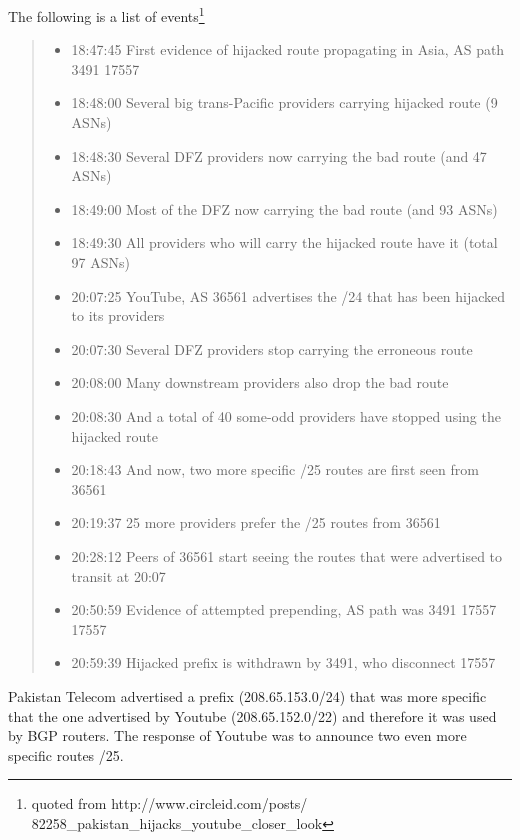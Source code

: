 The following is a list of events\footnote{quoted from http://www.circleid.com/posts/ 82258\_pakistan\_hijacks\_youtube\_closer\_look}
\begin{quote}
\begin{itemize}
\item 18:47:45    First evidence of hijacked route propagating in Asia, AS path 3491 17557
\item 18:48:00    Several big trans-Pacific providers carrying hijacked route (9 ASNs)
\item 18:48:30    Several DFZ providers now carrying the bad route (and 47 ASNs)
\item 18:49:00    Most of the DFZ now carrying the bad route (and 93 ASNs)
\item 18:49:30    All providers who will carry the hijacked route have it (total 97 ASNs)
\item 20:07:25    YouTube, AS 36561 advertises the /24 that has been hijacked to its providers
\item 20:07:30    Several DFZ providers stop carrying the erroneous route
\item 20:08:00    Many downstream providers also drop the bad route
\item 20:08:30    And a total of 40 some-odd providers have stopped using the hijacked route
\item 20:18:43    And now, two more specific /25 routes are first seen from 36561
\item 20:19:37    25 more providers prefer the /25 routes from 36561
\item 20:28:12    Peers of 36561 start seeing the routes that were advertised to transit at 20:07
\item 20:50:59    Evidence of attempted prepending, AS path was 3491 17557 17557
\item 20:59:39    Hijacked prefix is withdrawn by 3491, who disconnect 17557
\end{itemize}
\end{quote}

Pakistan Telecom advertised a prefix (208.65.153.0/24) that was more specific that the one advertised by Youtube (208.65.152.0/22) and therefore it was used by BGP routers.
The response of Youtube was to announce two even more specific routes /25.
